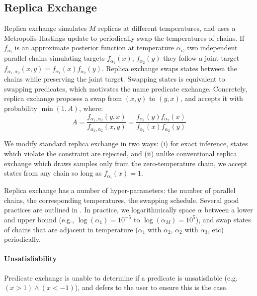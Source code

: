   
\subsection{Replica Exchange}\label{replicaexchange}
Replica exchange \citep{swendsen1986replica} simulates $M$ replicas at different temperatures, and uses a Metropolis-Hastings update to  periodically swap the temperatures of chains.
If $f_{\alpha_i}$ is an approximate posterior function at temperature $\alpha_i$, two independent parallel chains simulating targets $f_{\alpha_1}(x)$, $f_{\alpha_2}(y)$ they follow a joint target $f_{\alpha_1, \alpha_2}(x,y) = f_{\alpha_1}(x)f_{\alpha_2}(y)$.
Replica exchange swaps states between the chains while preserving the joint target.
Swapping states is equivalent to swapping predicates, which motivates the name predicate exchange.
Concretely, replica exchange proposes a swap from $(x, y)$ to $(y, x)$, and accepts it with probability $\min(1, A)$, where:
\begin{equation}
A =  \frac{f_{\alpha_1, \alpha_2}(y,x)}{f_{\alpha_1, \alpha_2}(x,y)} = \frac{f_{\alpha_1}(y)f_{\alpha_2}(x)}{f_{\alpha_1}(x)f_{\alpha_2}(y)}
\end{equation}

We modify standard replica exchange in two ways: (i) for exact inference, states which violate the constraint are rejected, and (ii)
unlike conventional replica exchange which draws samples only from the zero-temperature chain, we accept states from any chain so long as $f_{\alpha_i}(x) = 1$.

Replica exchange has a number of hyper-parameters: the number of parallel chains, the corresponding temperatures, the swapping schedule.
Several good practices are outlined in \cite{earl2005parallel}.  In practice, we logarithmically space $\alpha$ between a lower and upper bound (e.g., $\log(\alpha_1) = 10^{-5}$ to $\log(\alpha_M) = 10^5$), and swap states of chains that are adjacent in temperature ($\alpha_1$ with $\alpha_2$, $\alpha_2$ with $\alpha_3$, etc) periodically.

\paragraph{Unsatisfiability}Predicate exchange is unable to determine if a predicate is unsatisfiable (e.g.  $(x > 1) \land (x < -1)$), and defers to the user to ensure this is the case.




